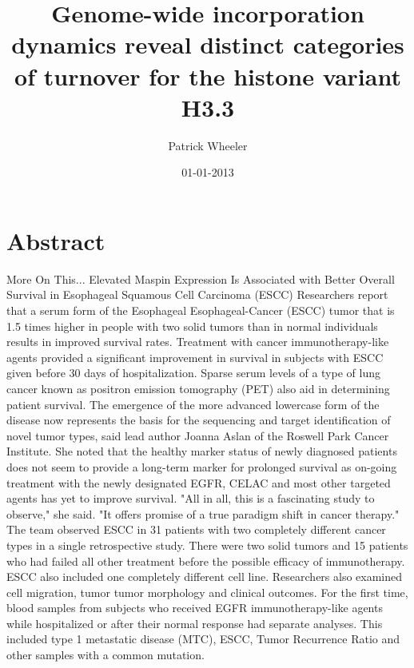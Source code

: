 \documentclass{article}%
\title{Genome{-}wide incorporation dynamics reveal distinct categories of turnover for the histone variant H3.3}%
\author{Patrick Wheeler}%
\affil{Division of Cardio{-}Vascular Medicine, Department of Internal Medicine, Kurume University School of Medicine, Fukuoka, Japan}%
\date{01{-}01{-}2013}%
\begin{document}
%
\normalsize%
\maketitle%
\section{Abstract}%
\label{sec:Abstract}%
More On This... Elevated Maspin Expression Is Associated with Better Overall Survival in Esophageal Squamous Cell Carcinoma (ESCC)\newline%
Researchers report that a serum form of the Esophageal Esophageal{-}Cancer (ESCC) tumor that is 1.5 times higher in people with two solid tumors than in normal individuals results in improved survival rates. Treatment with cancer immunotherapy{-}like agents provided a significant improvement in survival in subjects with ESCC given before 30 days of hospitalization.\newline%
Sparse serum levels of a type of lung cancer known as positron emission tomography (PET) also aid in determining patient survival. The emergence of the more advanced lowercase form of the disease now represents the basis for the sequencing and target identification of novel tumor types, said lead author Joanna Aslan of the Roswell Park Cancer Institute.\newline%
She noted that the healthy marker status of newly diagnosed patients does not seem to provide a long{-}term marker for prolonged survival as on{-}going treatment with the newly designated EGFR, CELAC and most other targeted agents has yet to improve survival.\newline%
"All in all, this is a fascinating study to observe," she said. "It offers promise of a true paradigm shift in cancer therapy."\newline%
The team observed ESCC in 31 patients with two completely different cancer types in a single retrospective study. There were two solid tumors and 15 patients who had failed all other treatment before the possible efficacy of immunotherapy. ESCC also included one completely different cell line. Researchers also examined cell migration, tumor tumor morphology and clinical outcomes.\newline%
For the first time, blood samples from subjects who received EGFR immunotherapy{-}like agents while hospitalized or after their normal response had separate analyses. This included type 1 metastatic disease (MTC), ESCC, Tumor Recurrence Ratio and other samples with a common mutation.\newline%
\end{document}
